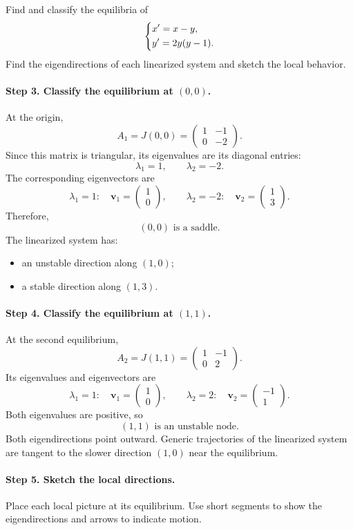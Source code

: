 \documentclass[10pt,letterpaper]{article}
\begin{document}
\begin{example}[5]{
Find and classify the equilibria of
\[
\begin{dcases}
x'=x-y,\\
y'=2y(y-1).
\end{dcases}
\]
Find the eigendirections of each linearized system
and sketch the local behavior.
}
\paragraph{Step 3. Classify the equilibrium at $(0,0)$.}
At the origin,
\[
A_1=J(0,0)=
\begin{pmatrix}
1&-1\\
0&-2
\end{pmatrix}.
\]
Since this matrix is triangular, its eigenvalues
are its diagonal entries:
\[
\lambda_1=1,\qquad \lambda_2=-2.
\]
The corresponding eigenvectors are
\[
\lambda_1=1:
\quad
\mathbf{v}_1=\begin{pmatrix}1\\0\end{pmatrix},
\qquad
\lambda_2=-2:
\quad
\mathbf{v}_2=\begin{pmatrix}1\\3\end{pmatrix}.
\]
Therefore,
\[
\boxed{(0,0)\text{ is a saddle}.}
\]
The linearized system has:
\begin{itemize}
    \item an unstable direction along $(1,0)$;
    \item a stable direction along $(1,3)$.
\end{itemize}

\paragraph{Step 4. Classify the equilibrium at $(1,1)$.}
At the second equilibrium,
\[
A_2=J(1,1)=
\begin{pmatrix}
1&-1\\
0&2
\end{pmatrix}.
\]
Its eigenvalues and eigenvectors are
\[
\lambda_1=1:
\quad
\mathbf{v}_1=\begin{pmatrix}1\\0\end{pmatrix},
\qquad
\lambda_2=2:
\quad
\mathbf{v}_2=\begin{pmatrix}-1\\1\end{pmatrix}.
\]
Both eigenvalues are positive, so
\[
\boxed{(1,1)\text{ is an unstable node}.}
\]
Both eigendirections point outward. Generic trajectories
of the linearized system are tangent to the slower
direction $(1,0)$ near the equilibrium.

\paragraph{Step 5. Sketch the local directions.}
Place each local picture at its equilibrium.
Use short segments to show the eigendirections
and arrows to indicate motion.


\end{example}
\end{document}
